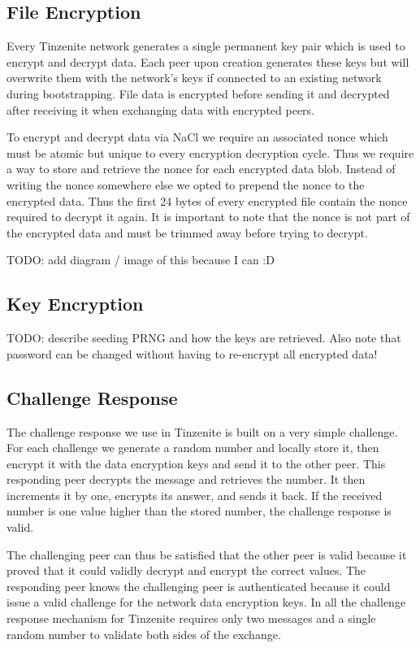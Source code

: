 \subsection{File Encryption}
\label{sub:File Encryption}

Every Tinzenite network generates a single permanent key pair which is used to encrypt and decrypt data.
Each peer upon creation generates these keys but will overwrite them with the network's keys if connected to an existing network during bootstrapping.
File data is encrypted before sending it and decrypted after receiving it when exchanging data with encrypted peers.

To encrypt and decrypt data via NaCl we require an associated nonce which must be atomic but unique to every encryption decryption cycle.
Thus we require a way to store and retrieve the nonce for each encrypted data blob.
Instead of writing the nonce somewhere else we opted to prepend the nonce to the encrypted data. %
Thus the first 24 bytes of every encrypted file contain the nonce required to decrypt it again.
It is important to note that the nonce is not part of the encrypted data and must be trimmed away before trying to decrypt.

TODO: add diagram / image of this because I can :D

\subsection{Key Encryption}
\label{sub:Key Encryption}

TODO: describe seeding PRNG and how the keys are retrieved.
Also note that password can be changed without having to re-encrypt all encrypted data!

\subsection{Challenge Response}
\label{sub:Challenge Response}

The challenge response we use in Tinzenite is built on a very simple challenge.
For each challenge we generate a random number and locally store it, then encrypt it with the data encryption keys and send it to the other peer.
This responding peer decrypts the message and retrieves the number.
It then increments it by one, encrypts its answer, and sends it back.
If the received number is one value higher than the stored number, the challenge response is valid.

The challenging peer can thus be satisfied that the other peer is valid because it proved that it could validly decrypt and encrypt the correct values.
The responding peer knows the challenging peer is authenticated because it could issue a valid challenge for the network data encryption keys.
In all the challenge response mechanism for Tinzenite requires only two messages and a single random number to validate both sides of the exchange.
